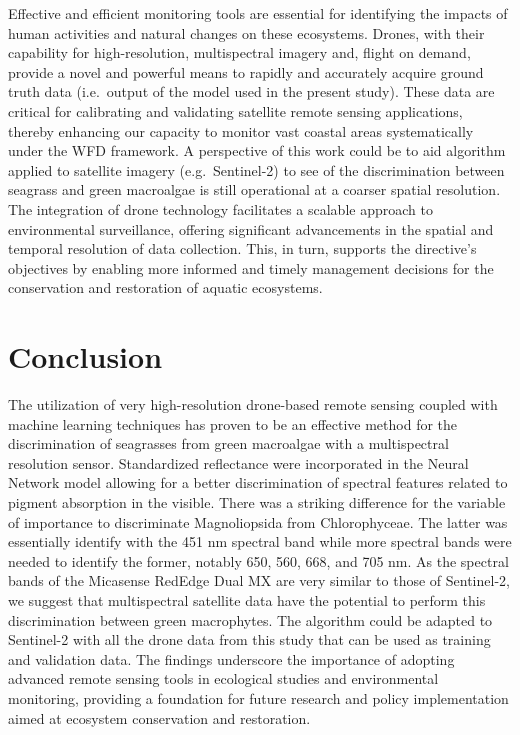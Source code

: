 \documentclass[
  number]{elsarticle}
\begin{document}
Effective and efficient monitoring tools are essential for identifying
the impacts of human activities and natural changes on these ecosystems.
Drones, with their capability for high-resolution, multispectral imagery
and, flight on demand, provide a novel and powerful means to rapidly and
accurately acquire ground truth data (i.e.~output of the model used in
the present study). These data are critical for calibrating and
validating satellite remote sensing applications, thereby enhancing our
capacity to monitor vast coastal areas systematically under the WFD
framework. A perspective of this work could be to aid algorithm applied
to satellite imagery (e.g.~Sentinel-2) to see of the discrimination
between seagrass and green macroalgae is still operational at a coarser
spatial resolution. The integration of drone technology facilitates a
scalable approach to environmental surveillance, offering significant
advancements in the spatial and temporal resolution of data collection.
This, in turn, supports the directive's objectives by enabling more
informed and timely management decisions for the conservation and
restoration of aquatic ecosystems.

\section{Conclusion}\label{conclusion}

The utilization of very high-resolution drone-based remote sensing
coupled with machine learning techniques has proven to be an effective
method for the discrimination of seagrasses from green macroalgae with a
multispectral resolution sensor. Standardized reflectance were
incorporated in the Neural Network model allowing for a better
discrimination of spectral features related to pigment absorption in the
visible. There was a striking difference for the variable of importance
to discriminate Magnoliopsida from Chlorophyceae. The latter was
essentially identify with the 451 nm spectral band while more spectral
bands were needed to identify the former, notably 650, 560, 668, and 705
nm. As the spectral bands of the Micasense RedEdge Dual MX are very
similar to those of Sentinel-2, we suggest that multispectral satellite
data have the potential to perform this discrimination between green
macrophytes. The algorithm could be adapted to Sentinel-2 with all the
drone data from this study that can be used as training and validation
data. The findings underscore the importance of adopting advanced remote
sensing tools in ecological studies and environmental monitoring,
providing a foundation for future research and policy implementation
aimed at ecosystem conservation and restoration.


  
\end{document}
